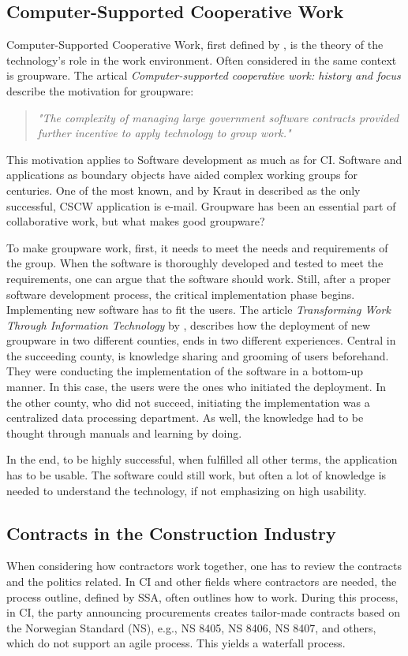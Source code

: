 \subsection{Computer-Supported Cooperative Work}
Computer-Supported Cooperative Work, first defined by \cite{Friedman}, is the theory of the technology's role in the work environment. Often considered in the same context is groupware. The artical \textit{Computer-supported cooperative work: history and focus} \cite{Grudin} describe the motivation for groupware: 
\begin{quotation}
    \noindent \textit{"The complexity of managing large government software contracts provided further incentive to apply technology to group work."}
\end{quotation}
This motivation applies to Software development as much as for CI. Software and applications as boundary objects have aided complex working groups for centuries. One of the most known, and by Kraut in \cite{Kraut} described as the only successful, CSCW application is e-mail. Groupware has been an essential part of collaborative work, but what makes good groupware? 

To make groupware work, first, it needs to meet the needs and requirements of the group. When the software is thoroughly developed and tested to meet the requirements, one can argue that the software should work. Still, after a proper software development process, the critical implementation phase begins. Implementing new software has to fit the users. The article \textit{Transforming Work Through Information Technology} by \cite{Robey&Sahay}, describes how the deployment of new groupware in two different counties, ends in two different experiences. Central in the succeeding county, is knowledge sharing and grooming of users beforehand. They were conducting the implementation of the software in a bottom-up manner. In this case, the users were the ones who initiated the deployment. In the other county, who did not succeed, initiating the implementation was a centralized data processing department. As well, the knowledge had to be thought through manuals and learning by doing.

In the end, to be highly successful, when fulfilled all other terms, the application has to be usable. The software could still work, but often a lot of knowledge is needed to understand the technology, if not emphasizing on high usability. 

\subsection{Contracts in the Construction Industry}
When considering how contractors work together, one has to review the contracts and the politics related. In CI and other fields where contractors are needed, the process outline, defined by SSA, often outlines how to work. During this process, in CI, the party announcing procurements creates tailor-made contracts based on the Norwegian Standard (NS), e.g., NS 8405, NS 8406, NS 8407, and others, which do not support an agile process. This yields a waterfall process. 

